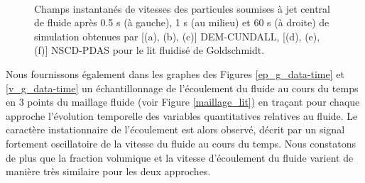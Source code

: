 \begin{figure}[h!]
\hspace{\fill}
   \\
\caption{\centering Champs instantanés de vitesses des particules soumises à jet central de fluide après 0.5 s (à gauche), 1 s (au milieu) et 60 s (à droite) de simulation obtenues par [(a), (b), (c)] DEM-CUNDALL, [(d), (e), (f)] NSCD-PDAS pour le lit fluidisé de Goldschmidt.}\label{granular_flow}
\end{figure}

Nous fournissons également dans les graphes des Figures \ref{ep_g_data-time} et \ref{v_g_data-time} un échantillonnage de l'écoulement du fluide au cours du temps en $3$ points du maillage fluide (voir Figure \ref{maillage_lit}) en traçant pour chaque approche l'évolution temporelle des variables quantitatives relatives au fluide. Le caractère instationnaire de l'écoulement est alors observé, décrit par un signal fortement oscillatoire de la vitesse du fluide au cours du temps. Nous constatons de plus que la fraction volumique et la vitesse d'écoulement du fluide varient de manière très similaire pour les deux approches.

